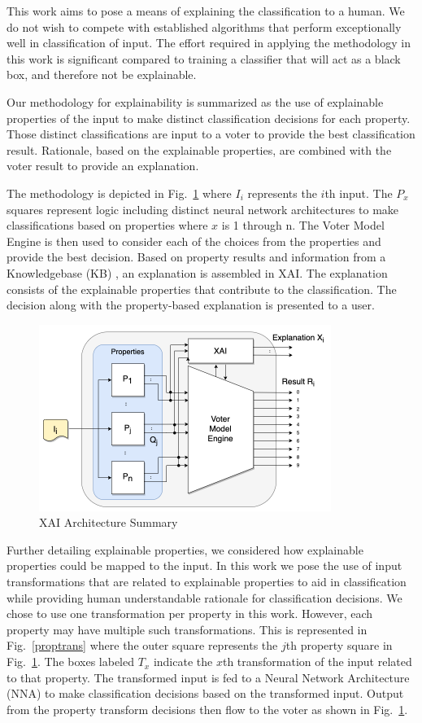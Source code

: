 \documentclass[conference]{IEEEtran}
\begin{document}
This work aims to pose a means of explaining the classification to a human.  We do not wish to compete with established algorithms that perform exceptionally well in classification of input.   The effort required in applying the methodology in this work is significant compared to training a classifier that will act as a black box, and therefore not be explainable.

Our methodology for explainability is summarized as the use of explainable properties of the input to make distinct classification decisions for each property.  Those distinct classifications are input to a voter to provide the best classification result.  Rationale, based on the explainable properties, are combined with the voter result to provide an explanation. 

The methodology is depicted in Fig.~\ref{voting} where $I_i$ represents the $i$th input.  The $P_x$ squares represent logic including distinct neural network architectures to make classifications based on properties where $x$ is 1 through n.  The Voter Model Engine is then used to consider each of the choices from the properties and provide the best decision.  Based on property results and information from a Knowledgebase (KB) , an explanation is assembled in XAI.   The explanation consists of the explainable properties that contribute to the classification.   The decision along with the property-based explanation is presented to a user.

 \begin{figure}[htbp]
\centerline{\includegraphics[width=95mm]{./images/voting_prop_nn_2.png}}
\caption{XAI Architecture Summary}
\label{voting}
\end{figure}

Further detailing explainable properties, we considered how explainable properties could be mapped to the input.  In this work we pose the use of input transformations that are related to explainable properties to aid in classification while providing human understandable rationale for classification decisions.  We chose to use one transformation per property in this work.  However, each property may have multiple such transformations.  This is represented in Fig.~\ref{proptrans} where the outer square represents the $j$th property square in Fig.~\ref{voting}.  The boxes labeled $T_x$ indicate the $x$th transformation of the input related to that property.  The transformed input is fed to a Neural Network Architecture (NNA) to make classification decisions based on the transformed input.  Output from the property transform decisions then flow to the voter as shown in Fig.~\ref{voting}.
\end{document}
